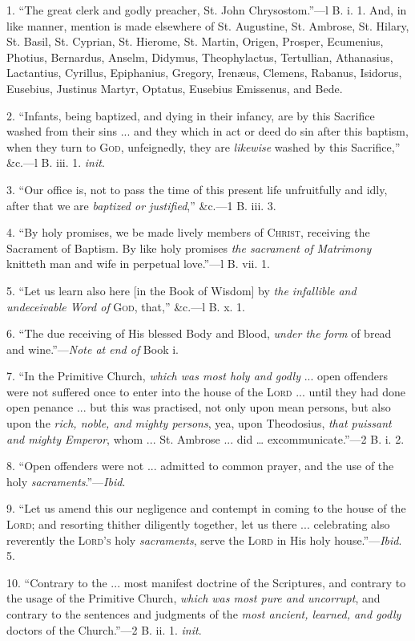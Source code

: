 1. ``The great clerk and godly preacher, St. John Chrysostom.''—l
B. i. 1. And, in like manner, mention is made elsewhere of St.
Augustine, St. Ambrose, St. Hilary, St. Basil, St. Cyprian, St.
Hierome, St. Martin, Origen, Prosper, Ecumenius, Photius, Bernardus,
Anselm, Didymus, Theophylactus, Tertullian, Athanasius, Lactantius,
Cyrillus, Epiphanius, Gregory, Irenæus, Clemens, Rabanus, Isidorus,
Eusebius, Justinus Martyr, Optatus, Eusebius Emissenus, and Bede.

2. ``Infants, being baptized, and dying in their infancy, are
by this Sacrifice washed from their sins ... and they which in act or
deed do sin after this baptism, when they turn to G\textsc{od},
unfeignedly, they are \emph{likewise} washed by this Sacrifice,''
\&c.—l B. iii. 1. \emph{init}.

3. ``Our office is, not to pass the time of this present life unfruitfully and idly, after that we are \emph{baptized or justified},''
\&c.—1 B. iii. 3.

4. ``By holy promises, we be made lively members of C\textsc{hrist},
receiving the Sacrament of Baptism. By like holy promises \emph{the
sacrament of Matrimony} knitteth man and wife in perpetual
love.''—l B. vii. 1.

5. ``Let us learn also here [in the Book of Wisdom] by \emph{the
infallible and undeceivable Word of} G\textsc{od},
that,'' \&c.—l B. x. 1.

6. ``The due receiving of His blessed Body and Blood, \emph{under
the form} of bread and wine.''—\emph{Note at end of} Book i.

7. ``In the Primitive Church, \emph{which was most holy and godly}
... open offenders were not suffered once to enter into the house of
the L\textsc{ord} ... until they had done open penance
... but this was practised, not only upon mean persons, but also upon
the \emph{rich, noble, and mighty persons}, yea, upon Theodosius, \emph{that
puissant and mighty Emperor}, whom ... St. Ambrose ... did …
excommunicate.''—2 B. i. 2.

8. ``Open offenders were not ... admitted to common prayer, and
the use of the holy \emph{sacraments}.''—\emph{Ibid}.

9. ``Let us amend this our negligence and contempt in coming to
the house of the L\textsc{ord}; and resorting thither
diligently together, let us there ... celebrating also reverently the
L\textsc{ord's} holy \emph{sacraments}, serve the L\textsc{ord}
in His holy house.''—\emph{Ibid}. 5.

10. ``Contrary to the ... most manifest doctrine of the
Scriptures, and contrary to the usage of the Primitive Church, \emph{which
was most pure and uncorrupt}, and contrary to the sentences and
judgments of the \emph{most ancient, learned, and godly} doctors of
the Church.''—2 B. ii. 1. \emph{init}.


